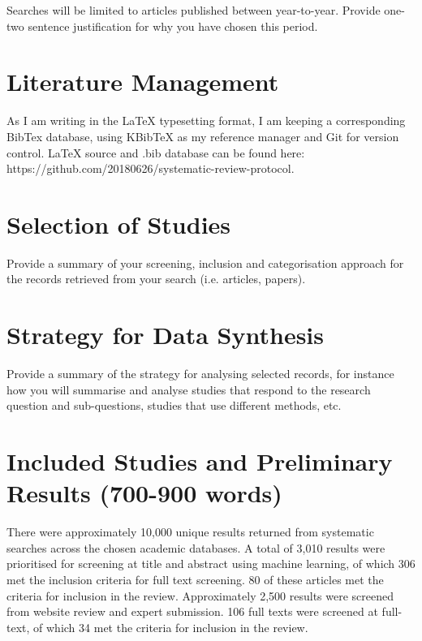 \documentclass[a4paper,12pt]{article}
\begin{document}
\par Searches will be limited to articles published between 
year-to-year. Provide one-two sentence justification for why you have 
chosen this period. 

\section*{Literature Management}

\par As I am writing in the LaTeX typesetting format, I am keeping a 
corresponding BibTex database, using KBibTeX as my reference 
manager and Git for version control. LaTeX source and .bib database 
can be found 
here: https://github.com/20180626/systematic-review-protocol.

\section*{Selection of Studies}

\par Provide a summary of your screening, inclusion and categorisation 
approach for the records retrieved from your search (i.e. articles, 
papers).

\section*{Strategy for Data Synthesis}

\par Provide a summary of the strategy for analysing selected records, 
for instance how you will summarise and analyse studies that respond 
to the research question and sub-questions, studies that use different 
methods, etc. 

\section*{Included Studies and Preliminary Results (700-900 words)}

\par There were approximately 10,000 unique results returned from 
systematic searches across the chosen academic databases. A total of 
3,010 results were prioritised for screening at title and abstract 
using machine learning, of which 306 met the inclusion criteria for 
full text screening. 80 of these articles met the criteria for 
inclusion in the review. Approximately 2,500 results were screened 
from website review and expert submission. 106 full texts were 
screened at full-text, of which 34 met the criteria for inclusion in 
the review. \\
\end{document}
